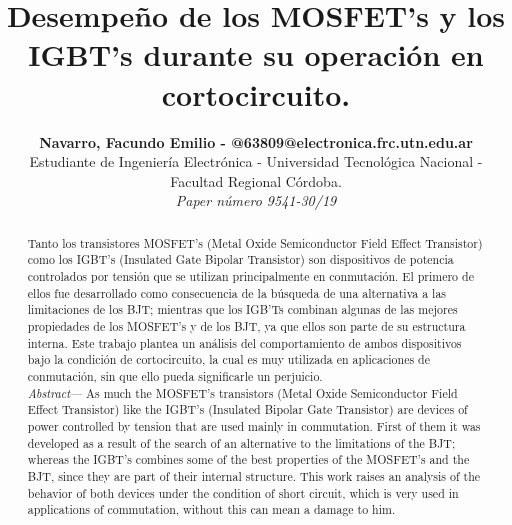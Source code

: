 \documentclass[conference]{IEEEtran}
\begin{document}
\title{Desempeño de los MOSFET's y los IGBT's durante su operación en cortocircuito.}
\author{
		\begin{tabular}{c}
			\textbf{Navarro, Facundo Emilio - @63809@electronica.frc.utn.edu.ar} \\ 
			Estudiante de Ingeniería Electrónica - Universidad Tecnológica Nacional - Facultad Regional Córdoba.\\
	\textit{Paper número 9541-30/19}
		\end{tabular}
		}
\maketitle

\begin{abstract}
Tanto los transistores MOSFET's (Metal Oxide Semiconductor Field Effect Transistor) como los IGBT's (Insulated Gate Bipolar Transistor) son dispositivos de potencia controlados por tensión que se utilizan principalmente en conmutación. El primero de ellos fue desarrollado como consecuencia de la búsqueda de una alternativa a las limitaciones de los BJT; mientras que los IGB'Ts combinan algunas de las mejores propiedades de los MOSFET's y de los BJT, ya que ellos son parte de su estructura interna. Este trabajo plantea un análisis del comportamiento de ambos dispositivos bajo la condición de cortocircuito, la cual es muy utilizada en aplicaciones de conmutación, sin que ello pueda significarle un perjuicio.\\

\textit{Abstract}--- As much the MOSFET's transistors (Metal Oxide Semiconductor Field Effect Transistor) like the IGBT's (Insulated Bipolar Gate Transistor) are devices of power controlled by tension that are used mainly in commutation.  First of them it was developed as a result of the search of an alternative to the limitations of the BJT;  whereas the IGBT's combines some of the best properties of the MOSFET's and the BJT, since they are part of their internal structure.  This work raises an analysis of the behavior of both devices under the condition of short circuit, which is very used in applications of commutation, without this can mean a damage to him.
\end{abstract} 

\IEEEpeerreviewmaketitle
\end{document}
